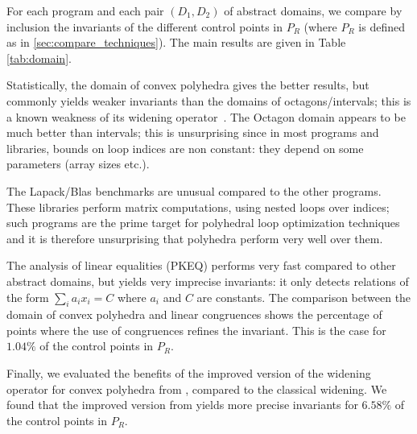 \documentclass{llncs}
\begin{document}
For each program and each pair $(D_1,D_2)$ of abstract domains, we compare by
inclusion the invariants of the different control points in $P_R$ (where $P_R$
is defined as in \ref{sec:compare_techniques}).
The main results are given in Table \ref{tab:domain}.

Statistically, the domain of convex polyhedra gives the better results, but
commonly yields weaker invariants than the domains of octagons/intervals;
this is a known weakness of its widening operator~\cite{Monniaux_LeGuen2011}. 
The Octagon domain appears to be much better than intervals; this is
unsurprising since in most programs and libraries, bounds on loop indices are
non constant: they depend on some parameters (array sizes etc.).

The Lapack/Blas benchmarks are unusual compared to the other programs. These libraries perform matrix computations, using nested loops over indices; such programs are the prime target for polyhedral loop optimization techniques and it is therefore unsurprising that polyhedra perform very well over them.

The analysis of linear equalities (PKEQ) performs very fast compared
to other abstract domains, but yields very imprecise invariants:
it only detects relations of the form $\sum_i a_i x_i = C$ where $a_i$ and $C$ are constants.
The comparison between the domain of convex polyhedra and linear congruences
shows the percentage of points where the use of congruences refines the
invariant. This is the case for $1.04\%$ of the control points in $P_R$.

Finally, we evaluated the benefits of the improved version of the widening
operator for convex polyhedra from \cite{BagnaraHRZ05SCP}, compared to the
classical widening. We found that the improved version from
\cite{BagnaraHRZ05SCP} yields more precise invariants for $6.58\%$ of the
control points in $P_R$.
\end{document}
